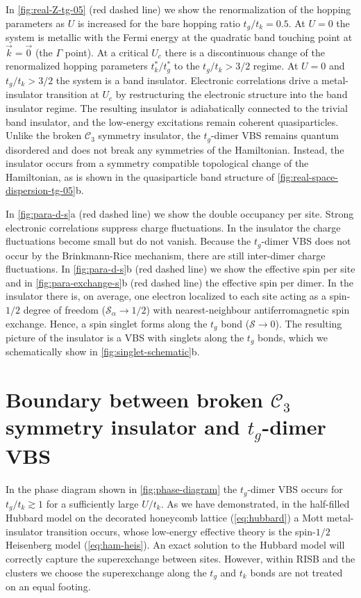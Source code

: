 \documentclass[reprint,aps,prb,amsmath,amssymb]{revtex4-2}
\begin{document}
In \cref{fig:real-Z-tg-05} (red dashed line) we show the renormalization of the hopping parameters as $U$ is increased for the bare hopping ratio $t_g/t_k = 0.5$. At $U = 0$ the system is metallic with the Fermi energy at the quadratic band touching point at $\vec{k} = \vec{0}$ (the $\Gamma$ point). At a critical $U_c$ there is a discontinuous change of the renormalized hopping parameters $t_k^* / t_g^*$ to the $t_g/t_k > 3 / 2$ regime. At $U = 0$ and $t_g/t_k > 3 / 2$ the system is a band insulator. Electronic correlations drive a metal-insulator transition at $U_c$ by restructuring the electronic structure into the band insulator regime. The resulting insulator is adiabatically connected to the trivial band insulator, and the low-energy excitations remain coherent quasiparticles. Unlike the broken $\mathcal{C}_3$ symmetry insulator, the $t_g$-dimer VBS remains quantum disordered and does not break any symmetries of the Hamiltonian. Instead, the insulator occurs from a symmetry compatible topological change of the Hamiltonian, as is shown in the quasiparticle band structure of \cref{fig:real-space-dispersion-tg-05}b.


In \cref{fig:para-d-s}a (red dashed line) we show the double occupancy per site. Strong electronic correlations suppress charge fluctuations. In the insulator the charge fluctuations become small but do not vanish. Because the $t_g$-dimer VBS does not occur by the Brinkmann-Rice mechanism, there are still inter-dimer charge fluctuations. In \cref{fig:para-d-s}b (red dashed line) we show the effective spin per site and in \cref{fig:para-exchange-s}b (red dashed line) the effective spin per dimer. In the insulator there is, on average, one electron localized to each site acting as a spin-$1/2$ degree of freedom ($\mathcal{S}_{\alpha} \rightarrow 1/2$) with nearest-neighbour antiferromagnetic spin exchange. Hence, a spin singlet forms along the $t_g$ bond ($\mathcal{S} \rightarrow 0$). The resulting picture of the insulator is a VBS with singlets along the $t_g$ bonds, which we schematically show in \cref{fig:singlet-schematic}b.

\section{Boundary between broken $\mathcal{C}_3$ symmetry insulator and $t_g$-dimer VBS}
\label{sec:boundary}

In the phase diagram shown in \cref{fig:phase-diagram} the $t_g$-dimer VBS occurs for $t_g/t_k \gtrsim 1$ for a sufficiently large $U / t_k$. As we have demonstrated, in the half-filled Hubbard model on the decorated honeycomb lattice (\cref{eq:hubbard}) a Mott metal-insulator transition occurs, whose low-energy effective theory is the spin-$1/2$ Heisenberg model (\cref{eq:ham-heis}). An exact solution to the Hubbard model will correctly capture the superexchange between sites. However, within RISB and the clusters we choose the superexchange along the $t_g$ and $t_k$ bonds are not treated on an equal footing.
\end{document}
